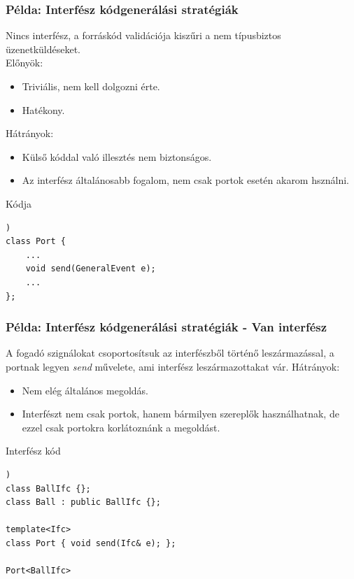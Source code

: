 \documentclass[11pt]{beamer}
\begin{document}
\begin{frame}[fragile]
	\frametitle{Példa: Interfész kódgenerálási stratégiák}
	Nincs interfész, a forráskód validációja kiszűri a nem típusbiztos üzenetküldéseket. \\
	Előnyök:
	\begin{itemize}
		\item Triviális, nem kell dolgozni érte.
		\item Hatékony.
	\end{itemize}
	Hátrányok:
	\begin{itemize}
		\item Külső kóddal való illesztés nem biztonságos.
		\item Az interfész általánosabb fogalom, nem csak portok esetén akarom hsználni.
	\end{itemize}
	
		\begin{block}{Kódja}
	\begin{lstlisting}[basicstyle=\small])
class Port {
	...
	void send(GeneralEvent e);
	...
};
	\end{lstlisting}
	\end{block}
\end{frame}

\begin{frame}[fragile]
	\frametitle{Példa: Interfész kódgenerálási stratégiák - Van interfész}
	
	A fogadó szignálokat csoportosítsuk az interfészből történő leszármazással, a portnak legyen \textit{send} művelete, ami interfész leszármazottakat vár.
	Hátrányok:
	\begin{itemize}
	\item Nem elég általános megoldás.
	\item Interfészt nem csak portok, hanem bármilyen szereplők használhatnak, de ezzel csak portokra korlátoznánk a megoldást.
	\end{itemize}
	
		\begin{block}{Interfész kód}
	\begin{lstlisting}[basicstyle=\small])
class BallIfc {};
class Ball : public BallIfc {};

template<Ifc>
class Port { void send(Ifc& e); };

Port<BallIfc>
	\end{lstlisting}
	\end{block}

\end{frame}
\end{document}
